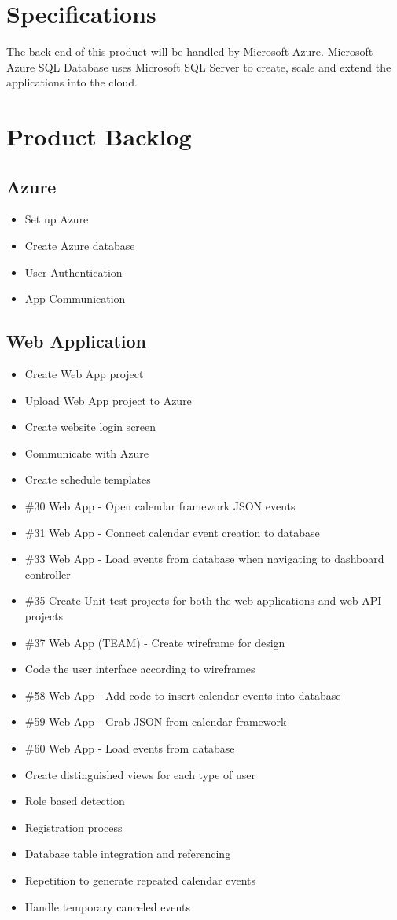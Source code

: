 \section{Specifications}
The back-end of this product will be handled by Microsoft Azure. Microsoft Azure SQL Database uses Microsoft SQL Server to create, scale and extend the applications into the cloud. 

\section{Product Backlog}
\subsection*{Azure}
\begin{itemize}
\item Set up Azure
\item Create Azure database
\item User Authentication
\item App Communication
\end{itemize}

\subsection*{Web Application}
\begin{itemize}
\item Create Web App project
\item Upload Web App project to Azure
\item Create website login screen
\item Communicate with Azure
\item Create schedule templates
\item \#30 Web App - Open calendar framework JSON events
\item \#31 Web App - Connect calendar event creation to database
\item \#33 Web App - Load events from database when navigating to dashboard controller
\item \#35 Create Unit test projects for both the web applications and web API projects
\item \#37 Web App (TEAM) - Create wireframe for design
\item Code the user interface according to wireframes
\item \#58 Web App - Add code to insert calendar events into database
\item \#59 Web App - Grab JSON from calendar framework
\item \#60 Web App - Load events from database
\item Create distinguished views for each type of user
\item Role based detection
\item Registration process
\item Database table integration and referencing
\item Repetition to generate repeated calendar events
\item Handle temporary canceled events
\end{itemize}

